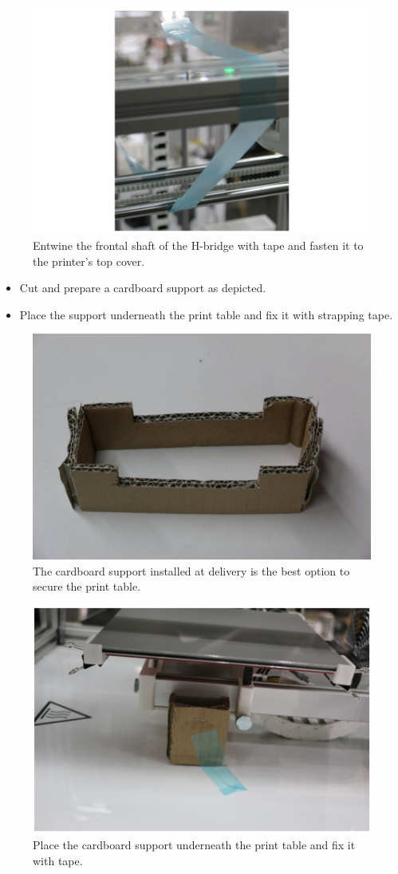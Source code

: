 \begin{figure}[H]
  \centering
  \includegraphics[width=.7\linewidth]{./img/secure_hbridge_front.png}
  \caption{Entwine the frontal shaft of the H-bridge with tape and fasten it to the printer's top cover.}
\end{figure}

\begin{itemize}
  \item Cut and prepare a cardboard support as depicted.
  \item Place the support underneath the print table and fix it with strapping tape.
\end{itemize}

\begin{figure}[H]
  \centering
  \includegraphics[width=.7\linewidth]{./img/img_1708.jpg}
  \caption{The cardboard support installed at delivery is the best option to secure the print table.}
\end{figure}

\begin{figure}[H]
  \centering
  \includegraphics[width=.7\linewidth]{./img/secure_printtable.png}
  \caption{Place the cardboard support underneath the print table and fix it with tape.}
\end{figure}


